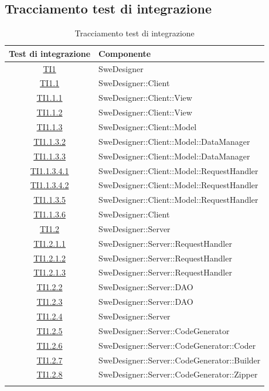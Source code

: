 \documentclass[../PianoDiQualifica.tex]{subfiles}
\begin{document}
	
	
	\newpage
	\subsection{Tracciamento test di integrazione}
	\normalsize
	\begin{longtable}{|c|l|}
		\hline
		\textbf{Test di integrazione} & \textbf{Componente}\\
		\hline
		\endhead
		\hyperlink{TI1}{TI1} & SweDesigner \\
		\hline
		\hyperlink{TI1.1}{TI1.1} & SweDesigner::Client \\
		\hline
		\hyperlink{TI1.1.1}{TI1.1.1} & SweDesigner::Client::View \\
		\hline
		\hyperlink{TI1.1.2}{TI1.1.2} & SweDesigner::Client::View \\
		\hline
		\hyperlink{TI1.1.3}{TI1.1.3} & SweDesigner::Client::Model \\
		\hline
		\hyperlink{TI1.1.3.2}{TI1.1.3.2} & SweDesigner::Client::Model::DataManager \\
		\hline
		\hyperlink{TI1.1.3.3}{TI1.1.3.3} & SweDesigner::Client::Model::DataManager \\
		\hline
		\hyperlink{TI1.1.3.4.1}{TI1.1.3.4.1} & SweDesigner::Client::Model::RequestHandler \\
		\hline
		\hyperlink{TI1.1.3.4.2}{TI1.1.3.4.2} & SweDesigner::Client::Model::RequestHandler \\
		\hline
		\hyperlink{TI1.1.3.5}{TI1.1.3.5} & SweDesigner::Client::Model::RequestHandler \\
		\hline
		\hyperlink{TI1.1.3.6}{TI1.1.3.6} & SweDesigner::Client \\
		\hline
		\hyperlink{TI1.2}{TI1.2} & SweDesigner::Server \\
		\hline
		\hyperlink{TI1.2.1.1}{TI1.2.1.1} & SweDesigner::Server::RequestHandler \\
		\hline
		\hyperlink{TI1.2.1.2}{TI1.2.1.2} & SweDesigner::Server::RequestHandler \\
		\hline
		\hyperlink{TI1.2.1.3}{TI1.2.1.3} & SweDesigner::Server::RequestHandler \\
		\hline
		\hyperlink{TI1.2.2}{TI1.2.2} & SweDesigner::Server::DAO \\
		\hline
		\hyperlink{TI1.2.3}{TI1.2.3} & SweDesigner::Server::DAO \\
		\hline
		\hyperlink{TI1.2.4}{TI1.2.4} & SweDesigner::Server \\
		\hline
		\hyperlink{TI1.2.5}{TI1.2.5} & SweDesigner::Server::CodeGenerator \\
		\hline
		\hyperlink{TI1.2.6}{TI1.2.6} & SweDesigner::Server::CodeGenerator::Coder \\
		\hline
		\hyperlink{TI1.2.7}{TI1.2.7} & SweDesigner::Server::CodeGenerator::Builder \\
		\hline
		\hyperlink{TI1.2.8}{TI1.2.8} & SweDesigner::Server::CodeGenerator::Zipper \\
		\hline
		\caption[Tracciamento test di integrazione]{Tracciamento test di integrazione}
		\label{tabella:TracciamentoTestIntegrazione}
		
	\end{longtable}
\end{document}
